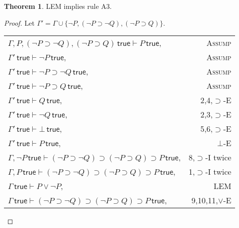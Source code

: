 \documentclass{article}
\newcounter{rowcount}
\theoremstyle{definition}
\newtheorem{theorem}{Theorem}[section]
\newcommand{\true}{\,\textsf{true}}
\begin{document}
\begin{theorem}
    LEM implies rule A3.
\end{theorem}
\setcounter{rowcount}{0}
\begin{proof}
    Let $\Gamma' = \Gamma \cup\{\neg P, (\neg P \supset \neg Q), (\neg P \supset Q)\}$.

    \begin{tabular}{@{\stepcounter{rowcount}\therowcount. }lr}
        $\Gamma, P, (\neg P \supset \neg Q), (\neg P \supset Q)\true \vdash P \true $,                & \textsc{Assump}     \\
        $\Gamma'\true \vdash \neg P\true$,                                                            & \textsc{Assump}     \\
        $\Gamma'\true \vdash \neg P \supset \neg Q\true$,                                             & \textsc{Assump}     \\
        $\Gamma'\true \vdash \neg P \supset Q\true$,                                                  & \textsc{Assump}     \\
        $\Gamma'\true \vdash Q\true$,                                                                 & 2,4,$\supset$-E     \\
        $\Gamma'\true \vdash \neg Q\true$,                                                            & 2,3,$\supset$-E     \\
        $\Gamma'\true \vdash \bot\true$,                                                              & 5,6,$\supset$-E     \\
        $\Gamma'\true \vdash P\true$,                                                                 & $\bot$-E            \\
        $\Gamma, \neg P\true \vdash (\neg P \supset \neg Q)\supset (\neg P \supset Q)\supset P\true$, & 8,$\supset$-I twice \\
        $\Gamma, P\true \vdash (\neg P \supset \neg Q)\supset (\neg P \supset Q)\supset P\true$,      & 1,$\supset$-I twice \\
        $\Gamma \true \vdash P\lor \neg P$,                                                           & LEM                 \\
        $\Gamma \true \vdash (\neg P \supset \neg Q)\supset (\neg P \supset Q)\supset P\true$,        & 9,10,11,$\lor$-E    \\
    \end{tabular}
\end{proof}
\end{document}
